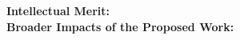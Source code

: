 \documentclass[11pt]{article}
\begin{document}
\hspace*{-0.28in} {\bf Intellectual Merit:} \\ 


\hspace*{-0.28in} {\bf Broader Impacts of the Proposed Work:} \\

\end{document}
